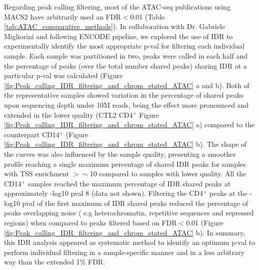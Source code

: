 Regarding peak calling filtering, most of the ATAC-seq publications using MACS2 have arbitrarily used an FDR$<$0.01 (Table \ref{tab:ATAC_comparative_methods}). In collaboration with Dr. Gabriele Migliorini and following ENCODE pipeline, we explored the use of IDR to experimentally identify the most appropriate p-val for filtering each individual sample. Each sample was partitioned in two, peaks were called in each half and the percentage of peaks (over the total number shared peaks) sharing IDR at a particular p-val was calculated (Figure \ref{fig:Peak_calling_IDR_filtering_and_chrom_stated_ATAC} a and b). Both of the representative samples showed variation in the percentage of shared peaks upon sequencing depth under 10M reads, being the effect more pronounced and extended in the lower quality (CTL2 CD4$^+$ Figure \ref{fig:Peak_calling_IDR_filtering_and_chrom_stated_ATAC} a) compared to the counterpart CD14$^+$ (Figure \ref{fig:Peak_calling_IDR_filtering_and_chrom_stated_ATAC} b). The shape of the curves was also influenced by the sample quality, presenting a smoother profile reaching a single maximum percentage of shared IDR peaks for samples with TSS enrichment $>\sim$10 compared to samples with lower quality. All the CD14$^+$ samples reached the maximum percentage of IDR shared peaks at approximately -log10 pval 8 (data not shown). 
Filtering the CD4$^+$ peaks at the -log10 pval of the first maximum of IDR shared peaks reduced the percentage of peaks overlapping noise ( e.g heterochromatin, repetitive sequences and repressed regions) when compared to peaks filtered based on FDR$<$0.01 (Figure \ref{fig:Peak_calling_IDR_filtering_and_chrom_stated_ATAC} b). In summary, this IDR analysis appeared as systematic method to identify an optimum p-val to perform individual filtering in a sample-specific manner and in a less arbitrary way than the extended 1\% FDR. 




